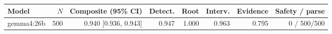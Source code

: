 \begin{tabular}{lrrrrrrr}
\toprule
Model & $N$ & Composite (95\% CI) & Detect. & Root & Interv. & Evidence & Safety / parse \\
\midrule
gemma4:26b & 500 & 0.940 [0.936, 0.943] & 0.947 & 1.000 & 0.963 & 0.795 & 0 / 500/500 \\
\bottomrule
\end{tabular}
